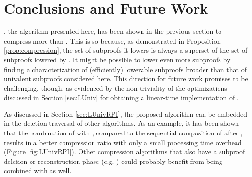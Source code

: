 \documentclass{llncs}
\begin{document}
% 






% 



\section{Conclusions and Future Work}

{\LowerUnivalents}, the algorithm presented here, has been shown in the previous section to compress
more than {\LowerUnits}. This is so because, as demonstrated in Proposition \ref{prop:compression}, the
set of subproofs it lowers is always a superset of the set of subproofs lowered by {\LowerUnits}. It might
be possible to lower even more subproofs by finding a characterization of (efficiently) lowerable subproofs
broader than that of univalent subproofs considered here. This direction for future work promises to be challenging, though, as evidenced by the non-triviality of the optimizations discussed in Section \ref{sec:LUniv} for obtaining a linear-time implementation of {\LowerUnivalents}.



As discussed in Section \ref{sec:LUnivRPI}, the proposed algorithm can be embedded in the deletion traversal of other algorithms.  As
an example, it has been shown that the combination of {\LowerUnivalents} with {\RPI}, compared to
the sequential composition of {\LowerUnits} after {\RPI}, results in a better compression ratio with
only a small processing time overhead (Figure \ref{fig:LUnivRPI}). Other compression algorithms that also have a subproof
deletion or reconstruction phase (e.g. \ReduceReconstruct) could probably benefit from being
combined with {\LowerUnivalents} as well.






\end{document}
